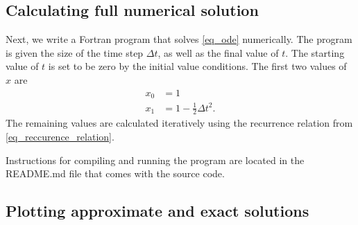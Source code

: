 \subsection{Calculating full numerical solution}


Next, we write a Fortran program that solves \autoref{eq_ode} numerically. The program is given the size of the time step $\Delta t$, as well as the final value of $t$. The starting value of $t$ is set to be zero by the initial value conditions. The first two values of $x$ are
\begin{align*}
  x_0 &= 1 \\
  x_1 &= 1 - \frac{1}{2} \Delta t^2.
\end{align*}
The remaining values are calculated iteratively using the recurrence relation from \autoref{eq_reccurence_relation}.


Instructions for compiling and running the program are located in the README.md file that comes with the source code.


\subsection{Plotting approximate and exact solutions}

